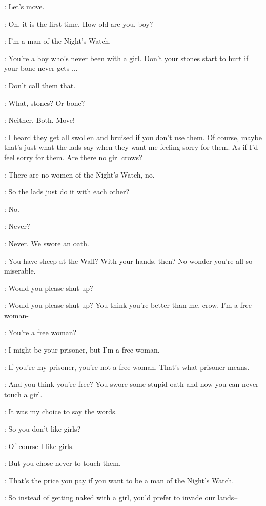 \JON: Let's move.

\YGRITTE: Oh, it is the first time. How old are you, boy?

\JON: I'm a man of the Night's Watch.

\YGRITTE: You're a boy who's never been with a girl. Don't your stones start to hurt if your bone never gets $\ldots$

\JON: Don't call them that.

\YGRITTE: What, stones? Or bone?

\JON: Neither. Both. Move!


\YGRITTE: I heard they get all swollen and bruised if you don't use them. Of course, maybe that's just what the lads say when they want me feeling sorry for them. As if I'd feel sorry for them. Are there no girl crows?

\JON: There are no women of the Night's Watch, no.

\YGRITTE: So the lads just do it with each other?

\JON: No.

\YGRITTE: Never?

\JON: Never. We swore an oath.

\YGRITTE: You have sheep at the Wall?  With your hands, then?  No wonder you're all so miserable.

\JON: Would you please shut up?

\YGRITTE:  Would you please shut up? You think you're better than me, crow. I'm a free woman-

\JON: You're a free woman?

\YGRITTE: I might be your prisoner, but I'm a free woman.

\JON: If you're my prisoner, you're not a free woman. That's what prisoner means.

\YGRITTE: And you think you're free? You swore some stupid oath and now you can never touch a girl.

\JON: It was my choice to say the words.

\YGRITTE: So you don't like girls?

\JON: Of course I like girls.

\YGRITTE: But you chose never to touch them.

\JON: That's the price you pay if you want to be a man of the Night's Watch.

\YGRITTE: So instead of getting naked with a girl, you'd prefer to invade our lands--

